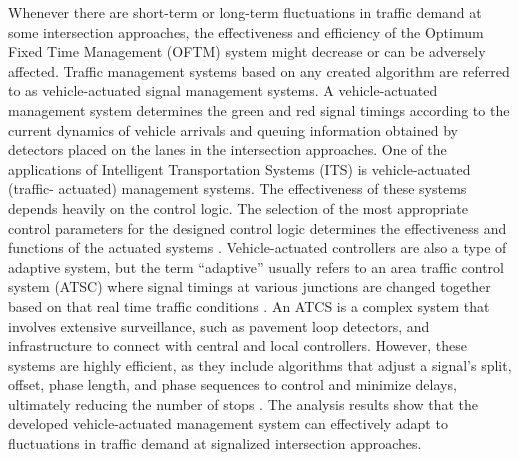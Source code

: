 Whenever there are short-term or long-term fluctuations in traffic 
demand at some intersection approaches, the effectiveness and 
efficiency of the Optimum Fixed Time Management (OFTM) system 
might decrease or can be adversely affected\cite{grether2011}. 
Traffic management systems based on any created algorithm are 
referred to as vehicle-actuated signal management systems. A 
vehicle-actuated management system determines the green and red 
signal timings according to the current dynamics of vehicle arrivals 
and queuing information obtained by detectors placed on the lanes 
in the intersection approaches\cite{akcelik1994}. One of the applications 
of Intelligent Transportation Systems (ITS) is vehicle-actuated (traffic- actuated) 
management systems. The effectiveness of these systems depends 
heavily on the control logic. The selection of the most appropriate 
control parameters for the designed control logic determines the 
effectiveness and functions of the actuated systems \cite{cakici2021}. 
Vehicle-actuated controllers are also a type of adaptive system, but 
the term “adaptive” usually refers to an area traffic control 
system (ATSC) where signal timings at various junctions are 
changed together based on that real time traffic conditions
\cite{ravikumar2012}. An ATCS is a complex system that involves 
extensive surveillance, such as pavement loop detectors, and 
infrastructure to connect with central and local controllers. 
However, these systems are highly efficient, as they include 
algorithms that adjust a signal's split, offset, phase length, 
and phase sequences to control and minimize delays, ultimately 
reducing the number of stops \cite{stevanovic2010}. The analysis 
results show that the developed vehicle-actuated management system 
can effectively adapt to fluctuations in traffic demand at signalized 
intersection approaches.

